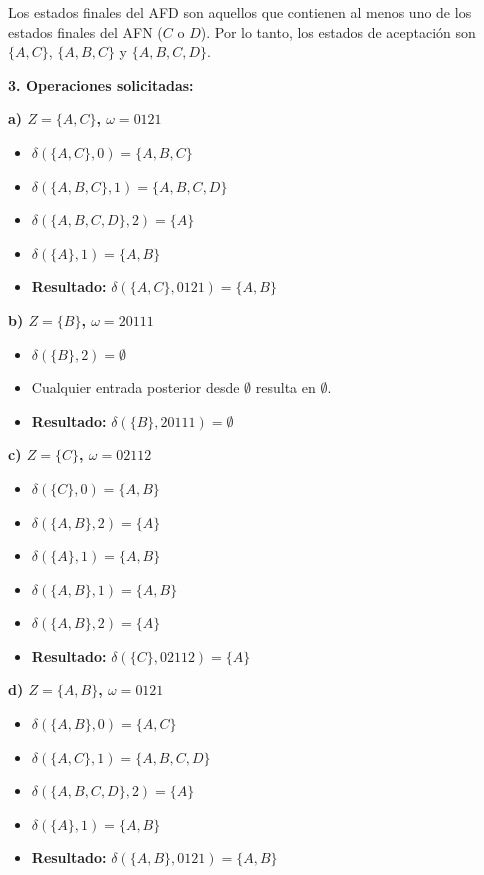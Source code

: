 \documentclass[12pt]{article}
\begin{document}
Los estados finales del AFD son aquellos que contienen al menos uno de los estados finales del AFN ($C$ o $D$). Por lo tanto, los estados de aceptación son $\{A, C\}$, $\{A, B, C\}$ y $\{A, B, C, D\}$.

\vspace{0.5cm}

\textbf{3. Operaciones solicitadas:}

\textbf{a) $Z=\{A,C\}$, $\omega=0121$}
\begin{itemize}
    \item $\delta(\{A, C\}, 0) = \{A, B, C\}$
    \item $\delta(\{A, B, C\}, 1) = \{A, B, C, D\}$
    \item $\delta(\{A, B, C, D\}, 2) = \{A\}$
    \item $\delta(\{A\}, 1) = \{A, B\}$
    \item \textbf{Resultado:} $\delta(\{A, C\}, 0121) = \{A, B\}$
\end{itemize}

\textbf{b) $Z=\{B\}$, $\omega=20111$}
\begin{itemize}
    \item $\delta(\{B\}, 2) = \emptyset$
    \item Cualquier entrada posterior desde $\emptyset$ resulta en $\emptyset$.
    \item \textbf{Resultado:} $\delta(\{B\}, 20111) = \emptyset$
\end{itemize}

\textbf{c) $Z=\{C\}$, $\omega=02112$}
\begin{itemize}
    \item $\delta(\{C\}, 0) = \{A, B\}$
    \item $\delta(\{A, B\}, 2) = \{A\}$
    \item $\delta(\{A\}, 1) = \{A, B\}$
    \item $\delta(\{A, B\}, 1) = \{A, B\}$
    \item $\delta(\{A, B\}, 2) = \{A\}$
    \item \textbf{Resultado:} $\delta(\{C\}, 02112) = \{A\}$
\end{itemize}

\textbf{d) $Z=\{A,B\}$, $\omega=0121$}
\begin{itemize}
    \item $\delta(\{A, B\}, 0) = \{A, C\}$
    \item $\delta(\{A, C\}, 1) = \{A, B, C, D\}$
    \item $\delta(\{A, B, C, D\}, 2) = \{A\}$
    \item $\delta(\{A\}, 1) = \{A, B\}$
    \item \textbf{Resultado:} $\delta(\{A, B\}, 0121) = \{A, B\}$
\end{itemize}
\end{document}
